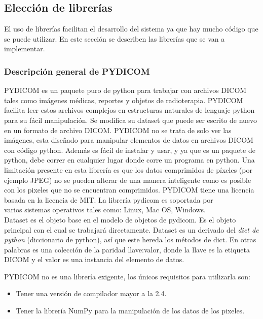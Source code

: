 \documentclass[12pt]{report}
\begin{document}
\subsection{Elección de librerías}
El uso de librerías facilitan el desarrollo del sistema ya que hay mucho código que se puede utilizar. En este sección se describen las librerías que se van a implementar.

\subsubsection{Descripción general de PYDICOM}
PYDICOM es un paquete puro de python para trabajar con archivos DICOM tales como imágenes médicas, reportes y objetos de radioterapia. PYDICOM facilita leer estos archivos complejos en estructuras naturales de lenguaje python para su fácil manipulación. Se modifica su dataset que puede ser escrito de nuevo en un formato de archivo DICOM. PYDICOM no se trata de solo ver las imágenes, esta diseñado para manipular elementos de datos en archivos DICOM con código python. Además es fácil de instalar y usar, y ya que es un paquete de python, debe correr en cualquier lugar donde corre un programa en python.
Una limitación presente en esta librería es que los datos comprimidos de píxeles (por ejemplo JPEG) no se pueden alterar de una manera inteligente como es posible con los pixeles que no se encuentran comprimidos. PYDICOM tiene una licencia basada en la licencia de MIT. La librería pydicom es soportada por\\ varios sistemas operativos tales como: Linux, Mac OS, Windows.\cite{pydi}\\

Dataset es el objeto base en el modelo de objetos de pydicom. Es el objeto principal con el cual se trabajará directamente. Dataset es un derivado del \textit{dict de python} (diccionario de python), así que este hereda los métodos de dict. En otras palabras es una colección de la paridad llave:valor, donde la llave es la etiqueta DICOM y el valor es una instancia del elemento de datos.\cite{pydi}

PYDICOM no es una librería exigente, los únicos requisitos para utilizarla son:
\begin{itemize}
\item Tener una versión de compilador mayor a la 2.4.
\item Tener la librería NumPy para la manipulación de los datos de los pixeles.
\end{itemize}
\end{document}
